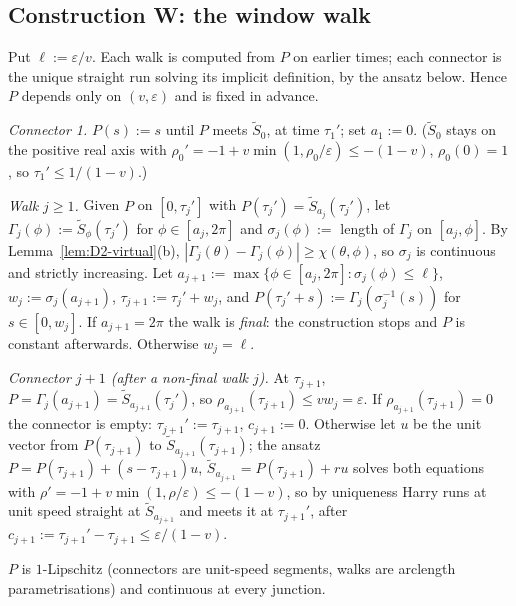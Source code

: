 \subsection{Construction W: the window walk}\label{sec:D2-W}
Put $\ell:=\varepsilon/v$. Each walk is computed from $P$ on earlier times; each connector is the unique straight run solving
its implicit definition, by the ansatz below. Hence $P$ depends only on $(v,\varepsilon)$ and is fixed in advance.

\emph{Connector 1.} $P(s):=s$ until $P$ meets $\tilde S_0$, at time $\tau_1'$; set $a_1:=0$. ($\tilde S_0$ stays on the positive
real axis with $\rho_0'=-1+v\min(1,\rho_0/\varepsilon)\le-(1-v)$, $\rho_0(0)=1$, so $\tau_1'\le1/(1-v)$.)

\emph{Walk $j\ge1$.} Given $P$ on $[0,\tau_j']$ with $P(\tau_j')=\tilde S_{a_j}(\tau_j')$, let $\Gamma_j(\phi):=\tilde S_\phi(\tau_j')$
for $\phi\in[a_j,2\pi]$ and $\sigma_j(\phi):=$ length of $\Gamma_j$ on $[a_j,\phi]$. By Lemma~\ref{lem:D2-virtual}(b),
$|\Gamma_j(\theta)-\Gamma_j(\phi)|\ge\chi(\theta,\phi)$, so $\sigma_j$ is continuous and strictly increasing. Let
$a_{j+1}:=\max\{\phi\in[a_j,2\pi]:\sigma_j(\phi)\le\ell\}$, $w_j:=\sigma_j(a_{j+1})$, $\tau_{j+1}:=\tau_j'+w_j$, and
$P(\tau_j'+s):=\Gamma_j(\sigma_j^{-1}(s))$ for $s\in[0,w_j]$. If $a_{j+1}=2\pi$ the walk is \emph{final}: the construction stops and
$P$ is constant afterwards. Otherwise $w_j=\ell$.

\emph{Connector $j+1$ (after a non-final walk $j$).} At $\tau_{j+1}$, $P=\Gamma_j(a_{j+1})=\tilde S_{a_{j+1}}(\tau_j')$, so
$\rho_{a_{j+1}}(\tau_{j+1})\le vw_j=\varepsilon$. If $\rho_{a_{j+1}}(\tau_{j+1})=0$ the connector is empty:
$\tau_{j+1}':=\tau_{j+1}$, $c_{j+1}:=0$. Otherwise let $u$ be the unit vector from $P(\tau_{j+1})$ to $\tilde S_{a_{j+1}}(\tau_{j+1})$;
the ansatz $P=P(\tau_{j+1})+(s-\tau_{j+1})u$, $\tilde S_{a_{j+1}}=P(\tau_{j+1})+r u$ solves both equations with
$\rho'=-1+v\min(1,\rho/\varepsilon)\le-(1-v)$, so by uniqueness Harry runs at unit speed straight at $\tilde S_{a_{j+1}}$ and meets it at
$\tau_{j+1}'$, after $c_{j+1}:=\tau_{j+1}'-\tau_{j+1}\le\varepsilon/(1-v)$.

$P$ is $1$-Lipschitz (connectors are unit-speed segments, walks are arclength parametrisations) and continuous at every junction.

